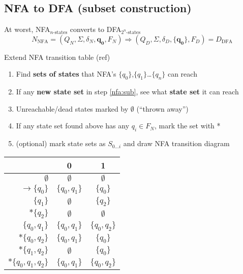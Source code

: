\documentclass[10pt,a4paper,landscape]{article}
\begin{document}
\begin{multicols*}{3}
\subsection*{NFA to DFA (subset construction)}
At worst, NFA$_{n\text{-states}}$ converts to DFA$_{2^{n}\text{-states}}$\\
\vspace{-0.5em}
{\footnotesize
\[
  N_{\text{NFA}} = (Q_{N},\Sigma,\delta_{N},\mathbf{q_{0}},F_{N}) \Rightarrow (Q_{D},\Sigma,\delta_{D},{\mathbf{\{q_{0}\}}},F_{D}) = D_{\text{DFA}}
\]
}
{\footnotesize
\begin{minipage}{0.5\linewidth}
Extend NFA transition table (ref)
  \begin{enumerate}[align=left]
    \item\label{nfa:sub} Find \textbf{sets of states} that NFA's \(\{q_{0}\}\),\(\{q_{1}\}\)\ldots\(\{q_{n }\}\) can reach
    \item If any \textbf{new state set} in step \ref{nfa:sub}, see what \textbf{state set} it can reach
    \item Unreachable/dead states marked by \(\emptyset\)  (``thrown away'')
    \item If any state set found above has any \(q_{i} \in F_{N}\), mark the set with *
    \item (optional) mark state sets as \(S_{0\ldots i}\) and draw NFA transition diagram
  \end{enumerate}
\end{minipage}%
\begin{minipage}{0.45\linewidth}
  \centering
\begin{tabular}{r||c|c}
   & 0 & 1 \\
  \hline
  \(\emptyset\) & \(\emptyset\) & \(\emptyset\)\\
  \(\rightarrow \{q_{0}\}\) & \(\{q_{0},q_{1}\}\) & \(\{q_{0}\}\)\\
  \(\{q_{1}\}\) & \(\emptyset\) & \(\{q_{2}\}\)\\
  \(*\{q_{2}\}\) & \(\emptyset\) & \(\emptyset\)\\
  \(\{q_{0},q_{1}\}\) & \(\{q_{0},q_{1}\}\) & \(\{q_{0},q_{2}\}\)\\
  \(*\{q_{0},q_{2}\}\) & \(\{q_{0},q_{1}\}\) & \(\{q_{0}\}\)\\
  \(*\{q_{1},q_{2}\}\) & \(\emptyset\) & \(\{q_{0}\}\)\\
  \(*\{q_{0},q_{1},q_{2}\}\) & \(\{q_{0},q_{1}\}\) & \(\{q_{0},q_{2}\}\)\\
  \hline
\end{tabular}
\end{minipage}
}


\end{multicols*}
\end{document}
